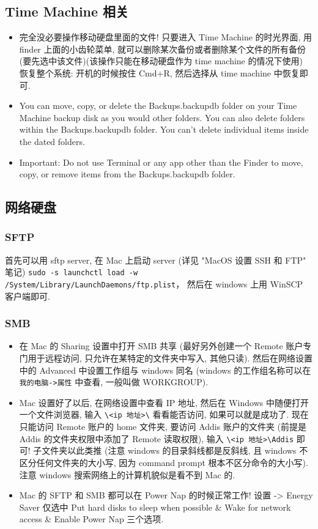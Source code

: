 \subsection{Time Machine 相关}
\begin{itemize}
\item 完全没必要操作移动硬盘里面的文件! 只要进入 Time Machine 的时光界面, 用 finder 上面的小齿轮菜单, 就可以删除某次备份或者删除某个文件的所有备份 (要先选中该文件)(该操作只能在移动硬盘作为 time machine 的情况下使用)
恢复整个系统: 开机的时候按住 Cmd+R, 然后选择从 time machine 中恢复即可.
\item You can move, copy, or delete the Backups.backupdb folder on your Time Machine backup disk as you would other folders. You can also delete folders within the Backups.backupdb folder. You can’t delete individual items inside the dated folders.
\item Important: Do not use Terminal or any app other than the Finder to move, copy, or remove items from the Backups.backupdb folder.
\end{itemize}

\subsection{网络硬盘}
\subsubsection{SFTP}
首先可以用 sftp server, 在 Mac 上启动 server (详见 "MacOS 设置 SSH 和 FTP" 笔记)
\verb|sudo -s launchctl load -w /System/Library/LaunchDaemons/ftp.plist|， 然后在 windows 上用 WinSCP 客户端即可.

\subsubsection{SMB}
\begin{itemize}
\item 在 Mac 的 Sharing 设置中打开 SMB 共享 (最好另外创建一个 Remote 账户专门用于远程访问, 只允许在某特定的文件夹中写入, 其他只读). 然后在网络设置中的 Advanced 中设置工作组与 windows 同名 (windows 的工作组名称可以在 \verb|我的电脑->属性| 中查看, 一般叫做 WORKGROUP).

\item Mac 设置好了以后, 在网络设置中查看 IP 地址, 然后在 Windows 中随便打开一个文件浏览器, 输入 \verb|\<ip 地址>\| 看看能否访问, 如果可以就是成功了. 现在只能访问 Remote 账户的 home 文件夹, 要访问 Addis 账户的文件夹 (前提是 Addis 的文件夹权限中添加了 Remote 读取权限), 输入 \verb|\<ip 地址>\Addis| 即可! 子文件夹以此类推 (注意 windows 的目录斜线都是反斜线, 且 windows 不区分任何文件夹的大小写, 因为 command prompt 根本不区分命令的大小写). 注意 windows 搜索网络上的计算机貌似是看不到 Mac 的.

\item Mac 的 SFTP 和 SMB 都可以在 Power Nap 的时候正常工作! 设置 -> Energy Saver 仅选中 Put hard disks to sleep when possible \& Wake for network access \& Enable Power Nap 三个选项.
\end{itemize}

